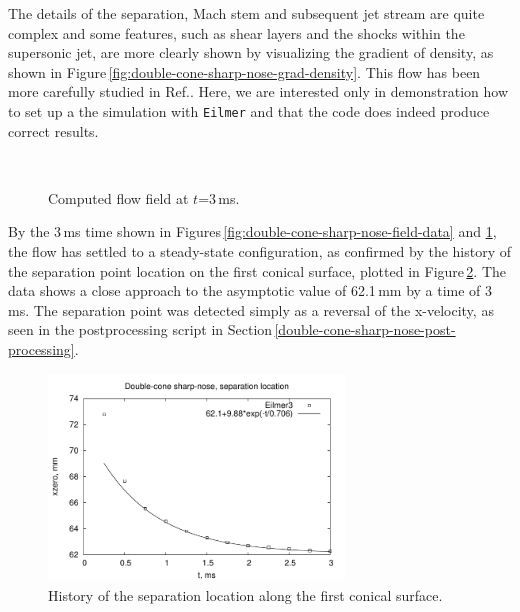 \medskip
The details of the separation, Mach stem and subsequent jet stream 
are quite complex and some features, such as
shear layers and the shocks within the supersonic jet, are 
more clearly shown by visualizing the gradient of density, as shown in 
Figure\,\ref{fig:double-cone-sharp-nose-grad-density}.
This flow has been more carefully studied in Ref.\cite{nompelis_etal_2003a}.
Here, we are interested only in demonstration how to set up a the simulation
with \texttt{Eilmer} and that the code does indeed produce correct results.

\begin{figure}[htb]
 \centering
 \\
 \caption{Computed flow field at $t$=3\,ms.}
 \label{fig:double-cone-sharp-nose-more-field-data}
\end{figure}


\medskip
By the 3\,ms time shown in Figures\,\ref{fig:double-cone-sharp-nose-field-data} 
and \ref{fig:double-cone-sharp-nose-more-field-data}, 
the flow has settled to a steady-state configuration,
as confirmed by the history of the separation point location on the first conical surface,
plotted in Figure\,\ref{fig:double-cone-sharp-nose-separation-point}.
The data shows a close approach to the asymptotic value of 62.1\,mm by a time of 3\,ms.
The separation point was detected simply as a reversal of the x-velocity, 
as seen in the postprocessing script
in Section\,\ref{double-cone-sharp-nose-post-processing}.

\begin{figure}[htb]
 \centering
 \includegraphics[width=0.7\textwidth]{../2D/double-cone-sharp-nose/separation-location.pdf}
 \caption{History of the separation location along the first conical surface.}
 \label{fig:double-cone-sharp-nose-separation-point}
\end{figure}


